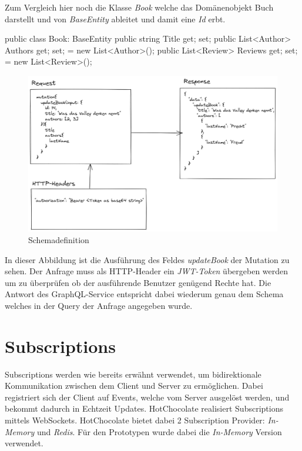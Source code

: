 Zum Vergleich hier noch die Klasse \textit{Book} welche das Domänenobjekt Buch darstellt und von \textit{BaseEntity} ableitet und damit eine \textit{Id} erbt.

\begin{JsCode}
public class Book: BaseEntity {
    public string Title { get; set; }
    public List<Author> Authors { get; set; } = new List<Author>();
    public List<Review> Reviews { get; set; } = new List<Review>();
}
\end{JsCode}


\begin{figure}[H]
    \includegraphics[width=\textwidth]{pics/execution_mutation.png}
    \caption{Schemadefinition}
\end{figure}

In dieser Abbildung ist die Ausführung des Feldes \textit{updateBook} der Mutation zu sehen.
Der Anfrage muss als HTTP-Header ein \textit{JWT-Token} übergeben werden um zu überprüfen ob der ausführende Benutzer genügend Rechte hat.
Die Antwort des GraphQL-Service entspricht dabei wiederum genau dem Schema welches in der Query der Anfrage angegeben wurde.


\section{Subscriptions}
Subscriptions werden wie bereits erwähnt verwendet, um bidirektionale Kommunikation zwischen dem Client und Server zu ermöglichen.
Dabei registriert sich der Client auf Events, welche vom Server ausgelöst werden, und bekommt dadurch in Echtzeit Updates.
HotChocolate realisiert Subscriptions mittels WebSockets.
HotChocolate bietet dabei 2 Subscription Provider: \textit{In-Memory} und \textit{Redis}.
Für den Prototypen wurde dabei die \textit{In-Memory} Version verwendet.

